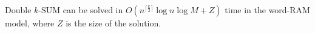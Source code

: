 \begin{lemma}[%
	label=lem:double%
]
	Double $k$-SUM can be solved in $O(n^{\lceil \frac{k}{2}
	\rceil} \log n \log M + Z)$ time in the word-RAM model, where $Z$ is
	the size of the solution.
\end{lemma}
